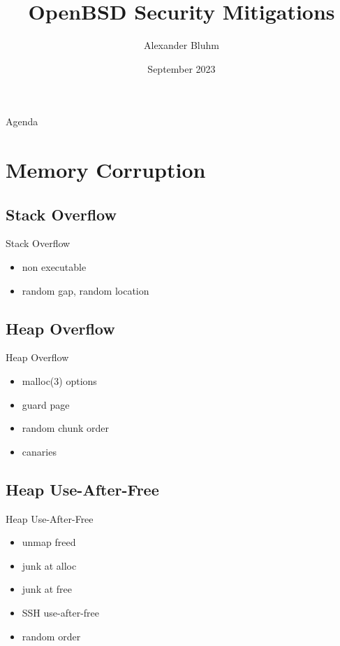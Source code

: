 \documentclass[14pt,aspectratio=169]{beamer}
\author{Alexander Bluhm}
\title{OpenBSD Security Mitigations}
\institute{genua GmbH\\ \url{bluhm@genua.de}\\ \url{bluhm@openbsd.org}}
\date{September 2023}
\begin{document}
\begin{frame}
\titlepage
\end{frame}

\begin{frame}{Agenda}
\setcounter{tocdepth}{1}
\tableofcontents
\end{frame}

\section{Memory Corruption}

\subsection{Stack Overflow}
\begin{frame}{Stack Overflow}
\begin{itemize}
  \item non executable
  \item random gap, random location
\end{itemize}
\end{frame}

\subsection{Heap Overflow}
\begin{frame}{Heap Overflow}
\begin{itemize}
  \item malloc(3) options
  \item guard page
  \item random chunk order
  \item canaries
\end{itemize}
\end{frame}

\subsection{Heap Use-After-Free}
\begin{frame}{Heap Use-After-Free}
\begin{itemize}
  \item unmap freed
  \item junk at alloc
  \item junk at free
  \item SSH use-after-free
  \item random order
\end{itemize}
\end{frame}
\end{document}
